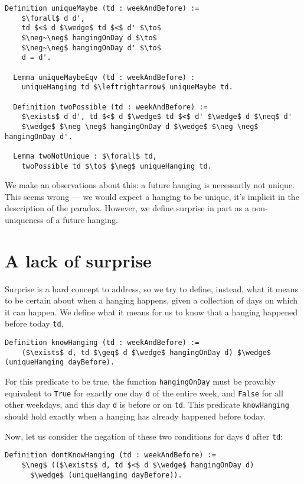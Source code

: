 \documentclass[runningheads]{llncs}
\begin{document}
\begin{lstlisting}[mathescape=true]
  Definition uniqueMaybe (td : weekAndBefore) :=
    $\forall$ d d',
    td $<$ d $\wedge$ td $<$ d' $\to$
    $\neg~\neg$ hangingOnDay d $\to$
    $\neg~\neg$ hangingOnDay d' $\to$
    d = d'.

  Lemma uniqueMaybeEqv (td : weekAndBefore) :
    uniqueHanging td $\leftrightarrow$ uniqueMaybe td.

  Definition twoPossible (td : weekAndBefore) :=
    $\exists$ d d', td $<$ d $\wedge$ td $<$ d' $\wedge$ d $\neq$ d'
    $\wedge$ $\neg \neg$ hangingOnDay d $\wedge$ $\neg \neg$ hangingOnDay d'.

  Lemma twoNotUnique : $\forall$ td,
    twoPossible td $\to$ $\neg$ uniqueHanging td.
\end{lstlisting}

We make an observations about this: a future hanging is
necessarily not unique. This seems wrong --- we would expect a hanging to be
unique, it's implicit in the description of the paradox. However, we define
surprise in part as a non-uniqueness of a future hanging.

\section{A lack of surprise}
\label{sec:lack}

Surprise is a hard concept to address, so we try to define, instead, what it means to be certain about
when a hanging happens, given a collection of days on which it can happen.
We define what it means for us to know that a hanging happened before today {\tt td},

\begin{lstlisting}[mathescape=true]
  Definition knowHanging (td : weekAndBefore) :=
    ($\exists$ d, td $\geq$ d $\wedge$ hangingOnDay d) $\wedge$ (uniqueHanging dayBefore).
\end{lstlisting}

For this predicate to be true, the function {\tt hangingOnDay} must be provably equivalent to \texttt{True}
for exactly one day {\tt d} of the entire week, and {\tt False} for all other weekdays, and this day {\tt d} is
before or on {\tt td}.
This predicate {\tt knowHanging} should hold exactly when a hanging has already happened
before today.

Now, let us consider the negation of these two conditions for days {\tt d} after {\tt td}:

\begin{lstlisting}[mathescape=true]
  Definition dontKnowHanging (td : weekAndBefore) :=
    $\neg$ (($\exists$ d, td $<$ d $\wedge$ hangingOnDay d)
      $\wedge$ (uniqueHanging dayBefore)).
\end{lstlisting}
\end{document}
